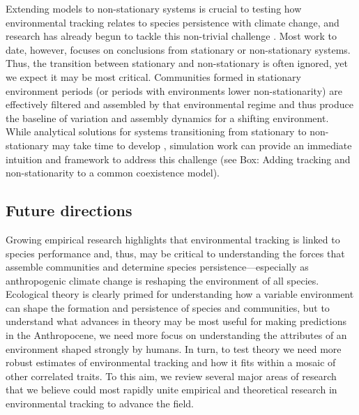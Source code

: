 \documentclass[11pt,letterpaper]{article}
\begin{document}
Extending models to non-stationary systems is crucial to testing how environmental tracking relates to species persistence with climate change, and research has already begun to tackle this non-trivial challenge \citep{chessonnonstat,legault2019,volkerass}. Most work to date, however, focuses on conclusions from stationary or non-stationary systems. Thus, the transition between stationary and non-stationary is often ignored, yet we expect it may be most critical. Communities formed in stationary environment periods (or periods with environments lower non-stationarity) are effectively filtered and assembled by that environmental regime and thus produce the baseline of variation and assembly dynamics for a shifting environment. While analytical solutions for systems transitioning from stationary to non-stationary may take time to develop \citep{chessonnonstat}, simulation work can provide an immediate intuition and framework to address this challenge (see Box: Adding tracking and non-stationarity to a common coexistence model). 
\subsection{Future directions}

Growing empirical research highlights that environmental tracking is linked to species performance and, thus, may be critical to understanding the forces that assemble communities and determine species persistence---especially as anthropogenic climate change is reshaping the environment of all species. Ecological theory is clearly primed for understanding how a variable environment can shape the formation and persistence of species  and communities, but to understand what advances in theory may be most useful for making predictions in the Anthropocene, we need more focus on understanding the attributes of an environment shaped strongly by humans. In turn, to test theory we need more robust estimates of environmental tracking and how it fits within a mosaic of other correlated traits. To this aim, we review several major areas of research that we believe could most rapidly unite empirical and theoretical research in environmental tracking to advance the field.\\ %
\end{document}

